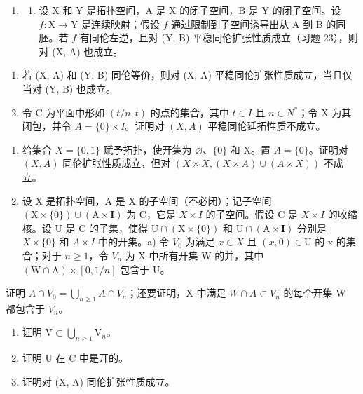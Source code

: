 \begin{enumerate}
\def\labelenumi{\arabic{enumi})}
\setcounter{enumi}{24}
\tightlist
\item
  \begin{enumerate}
  \def\labelenumii{\alph{enumii})}
  \tightlist
  \item
  设 X 和 Y 是拓扑空间，A 是 X 的闭子空间，B 是 Y 的闭子空间。设 \(f \colon \mathrm{X} \to \mathrm{Y}\) 是连续映射；假设 \(f\) 通过限制到子空间诱导出从 A 到 B 的同胚。若 \(f\) 有同伦左逆，且对 (Y, B) 平稳同伦扩张性质成立（习题 23），则对 (X, A) 也成立。
  \end{enumerate}
\end{enumerate}

\begin{enumerate}
\def\labelenumi{\alph{enumi})}
\setcounter{enumi}{1}
\item
  若 (X, A) 和 (Y, B) 同伦等价，则对 (X, A) 平稳同伦扩张性质成立，当且仅当对 (Y, B) 也成立。
\item
  令 C 为平面中形如 \((t/n,t)\) 的点的集合，其中 \(t \in I\) 且 \(n \in N^{*}\)；令 X 为其闭包，并令 \(A = \{0\} \times I\)。证明对 \((X,A)\) 平稳同伦延拓性质不成立。
\end{enumerate}

\begin{enumerate}
\def\labelenumi{\arabic{enumi})}
\setcounter{enumi}{25}
\item
  给集合 \(X = \{0,1\}\) 赋予拓扑，使开集为 \(\varnothing\)、\(\{0\}\) 和 X。置 \(A = \{0\}\)。证明对 \((X,A)\) 同伦扩张性质成立，但对 \((X \times X,(X \times A) \cup (A \times X))\) 不成立。
\item
  设 X 是拓扑空间，A 是 X 的子空间（不必闭）；记子空间 \((\mathrm{X} \times \{0\}) \cup (\mathrm{A} \times \mathbf{I})\) 为 C，它是 \(X \times I\) 的子空间。假设 C 是 \(X \times I\) 的收缩核。设 U 是 C 的子集，使得 \(\mathrm{U} \cap (\mathrm{X} \times \{0\})\) 和 \(\mathrm{U} \cap (\mathrm{A} \times \mathbf{I})\) 分别是 \(X \times \{0\}\) 和 \(A \times I\) 中的开集。a) 令 \(V_{0}\) 为满足 \(x \in X\) 且 \((x, 0) \in \mathrm{U}\) 的 x 的集合；对于 \(n \geqslant 1\)，令 \(V_{n}\) 为 X 中所有开集 W 的并，其中 \((\mathrm{W} \cap \mathrm{A}) \times [0, 1/n]\) 包含于 U。
\end{enumerate}

证明 \(A \cap V_{0} = \bigcup_{n \geqslant 1} A \cap V_{n}\)；还要证明，X 中满足 \(W \cap A \subset V_{n}\) 的每个开集 W 都包含于 \(V_{n}\)。

\begin{enumerate}
\def\labelenumi{\alph{enumi})}
\setcounter{enumi}{1}
\item
  证明 \(\mathrm{V} \subset \bigcup_{n \geqslant 1} \mathrm{V}_n\)。
\item
  证明 U 在 C 中是开的。
\item
  证明对 (X, A) 同伦扩张性质成立。
\end{enumerate}

